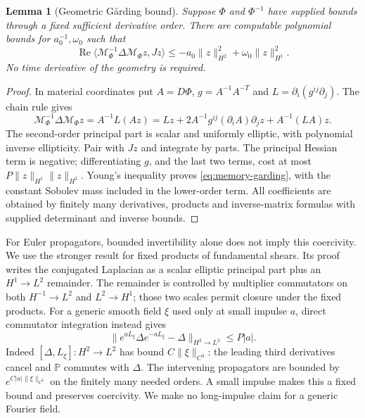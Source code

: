 \documentclass[11pt,a4paper]{amsart}
\newtheorem{lemma}[theorem]{Lemma}
\theoremstyle{definition}
\theoremstyle{remark}
\numberwithin{equation}{section}
\newcommand{\PP}{\mathbb P}
\newcommand{\Mcal}{\mathcal M}
\newcommand{\ip}[2]{\langle #1,#2\rangle}
\newcommand{\norm}[1]{\lVert #1\rVert}
\DeclareMathOperator{\Rea}{Re}
\begin{document}
\begin{lemma}[Geometric G\aa rding bound]\label{lem:memory-garding}
Suppose $\Phi$ and $\Phi^{-1}$ have supplied bounds through a fixed
sufficient derivative order.  There are computable polynomial bounds for
$a_0^{-1},\omega_0$ such that
\begin{equation}\label{eq:memory-garding}
 \Rea\ip{\Mcal_\Phi^{-1}\Delta\Mcal_\Phi z}{Jz}
 \le-a_0\norm z_{H^2}^2+\omega_0\norm z_{H^1}^2.
\end{equation}
No time derivative of the geometry is required.
\end{lemma}
\begin{proof}
In material coordinates put $A=D\Phi$, $g=A^{-1}A^{-T}$ and
$L=\partial_i(g^{ij}\partial_j)$.  The chain rule gives
\begin{equation}\label{eq:memory-principal}
 \Mcal_\Phi^{-1}\Delta\Mcal_\Phi z
 =A^{-1}L(Az)
 =Lz+2A^{-1}g^{ij}(\partial_iA)\partial_jz+A^{-1}(LA)z.
\end{equation}
The second-order principal part is scalar and uniformly elliptic, with
polynomial inverse ellipticity.  Pair with $Jz$ and integrate by parts.
The principal Hessian term is negative; differentiating $g$, and the last
two terms, cost at most $P\norm z_{H^1}\norm z_{H^2}$.  Young's inequality
proves \eqref{eq:memory-garding}, with the constant Sobolev mass included
in the lower-order term.  All coefficients are obtained by finitely many
derivatives, products and inverse-matrix formulas with supplied determinant
and inverse bounds.
\end{proof}

For Euler propagators, bounded invertibility alone does not imply this
coercivity.  We use the stronger result \cite[Lemmas~8.1--8.2]{Common} for
fixed products of fundamental shears.  Its proof writes the conjugated
Laplacian as a scalar elliptic principal part plus an $H^1\to L^2$
remainder.  The remainder is controlled by multiplier commutators on
both $H^{-1}\to L^2$ and $L^2\to H^1$; those two scales permit closure
under the fixed products.  For a generic smooth field $\xi$ used only at
small impulse $a$, direct commutator integration instead gives
\begin{equation}\label{eq:memory-small-euler}
 \norm{e^{aL_\xi}\Delta e^{-aL_\xi}-\Delta}_{H^2\to L^2}
 \le P|a|.
\end{equation}
Indeed $[\Delta,L_\xi]:H^2\to L^2$ has bound
$C\norm\xi_{C^3}$: the leading third derivatives cancel and $\PP$
commutes with $\Delta$.  The intervening propagators are bounded by
$e^{C|a|\norm\xi_{C^k}}$ on the finitely many needed orders.  A small
impulse makes this a fixed bound and preserves coercivity.  We make no
long-impulse claim for a generic Fourier field.
\end{document}
